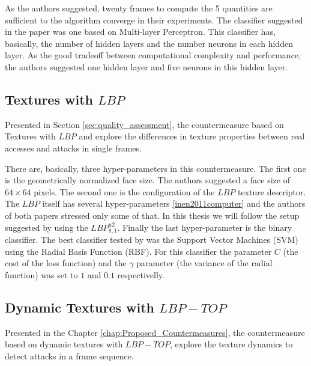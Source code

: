 As the authors suggested, twenty frames to compute the 5 quantities are sufficient to the algorithm converge in their experiments. The classifier suggested in the paper was one based on Multi-layer Perceptron. This classifier has, basically, the number of hidden layers and the number neurons in each hidden layer. As the good tradeoff between computational complexity and performance, the authors suggested one hidden layer and five neurons in this hidden layer.

\subsection{Textures with $LBP$}

Presented in Section \ref{sec:quality_assessment}, the countermeasure based on Textures with $LBP$ \cite{ChingovskaBIOSIG2012} and \cite{maatta2011face} explore the differences in texture properties between real accesses and attacks in single frames. 

There are, basically, three hyper-parameters in this countermeasure. The first one is the geometrically normalized face size. The authors suggested a face size of $64 \times 64$ pixels. The second one is the configuration of the $LBP$ texture descriptor. The $LBP$ itself has several hyper-parameters \ref{inen2011computer} and the authors of both papers stressed only some of that. In this thesis we will follow the setup suggested by \cite{ChingovskaBIOSIG2012} using the $LBP_{8,1}^{u2}$. Finally the last hyper-parameter is the binary classifier. The best classifier tested by \cite{ChingovskaBIOSIG2012} was the Support Vector Machines (SVM) using the Radial Basis Function (RBF). For this classifier the parameter $C$ (the cost of the loss function) and the $\gamma$ parameter (the variance of the radial function) was set to $1$ and $0.1$ respectivelly.

\subsection{Dynamic Textures with $LBP-TOP$}

Presented in the Chapter \ref{chap:Proposed_Countermeasures}, the countermeasure based on dynamic textures with $LBP-TOP$, explore the texture dynamics to detect attacks in a frame sequence.










